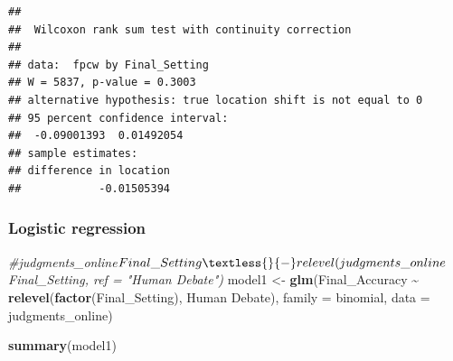 \documentclass[
]{article}
\newenvironment{Shaded}{\begin{snugshade}}{\end{snugshade}}
\newcommand{\AttributeTok}[1]{\textcolor[rgb]{0.13,0.29,0.53}{#1}}
\newcommand{\CommentTok}[1]{\textcolor[rgb]{0.56,0.35,0.01}{\textit{#1}}}
\newcommand{\ConstantTok}[1]{\textcolor[rgb]{0.56,0.35,0.01}{#1}}
\newcommand{\FunctionTok}[1]{\textcolor[rgb]{0.13,0.29,0.53}{\textbf{#1}}}
\newcommand{\NormalTok}[1]{#1}
\newcommand{\OtherTok}[1]{\textcolor[rgb]{0.56,0.35,0.01}{#1}}
\newcommand{\SpecialCharTok}[1]{\textcolor[rgb]{0.81,0.36,0.00}{\textbf{#1}}}
\newcommand{\StringTok}[1]{\textcolor[rgb]{0.31,0.60,0.02}{#1}}
\begin{document}
\begin{Shaded}
\end{Shaded}

\begin{verbatim}
## 
##  Wilcoxon rank sum test with continuity correction
## 
## data:  fpcw by Final_Setting
## W = 5837, p-value = 0.3003
## alternative hypothesis: true location shift is not equal to 0
## 95 percent confidence interval:
##  -0.09001393  0.01492054
## sample estimates:
## difference in location 
##            -0.01505394
\end{verbatim}

\subsubsection{Logistic regression}\label{logistic-regression}

\begin{Shaded}
\begin{Highlighting}[]
\CommentTok{\#judgments\_online$Final\_Setting \textless{}{-} relevel(judgments\_online$Final\_Setting, ref = "Human Debate")}
\NormalTok{model1 }\OtherTok{\textless{}{-}} \FunctionTok{glm}\NormalTok{(Final\_Accuracy }\SpecialCharTok{\textasciitilde{}} \FunctionTok{relevel}\NormalTok{(}\FunctionTok{factor}\NormalTok{(Final\_Setting), }\StringTok{\textquotesingle{}Human Debate\textquotesingle{}}\NormalTok{), }\AttributeTok{family =} \StringTok{\textquotesingle{}binomial\textquotesingle{}}\NormalTok{, }\AttributeTok{data =}\NormalTok{ judgments\_online)}

\FunctionTok{summary}\NormalTok{(model1)}
\end{Highlighting}
\end{Shaded}
\end{document}
